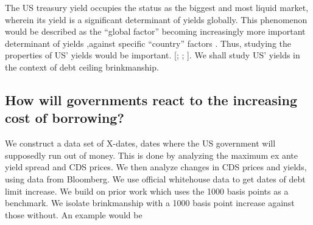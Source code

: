 \documentclass[
  12pt]{article}
\begin{document}
The US treasury yield occupies the status as the biggest and most liquid
market, wherein its yield is a significant determinant of yields
globally. This phenomenon would be described as the ``global factor''
becoming increasingly more important determinant of yields ,against
specific ``country'' factors \citet{mauro2002}. Thus, studying the
properties of US' yields would be important. {[}\citet{rozada2006};
\citet{gonzález-rozada2008}; \citet{longstaff2011}{]}. We shall study
US' yields in the context of debt ceiling brinkmanship.

\hypertarget{how-will-governments-react-to-the-increasing-cost-of-borrowing}{%
\subsection{How will governments react to the increasing cost of
borrowing?}\label{how-will-governments-react-to-the-increasing-cost-of-borrowing}}

We construct a data set of X-dates, dates where the US government will
supposedly run out of money. This is done by analyzing the maximum ex
ante yield spread and CDS prices. We then analyze changes in CDS prices
and yields, using data from Bloomberg. We use official whitehouse data
to get dates of debt limit increase. We build on prior work which uses
the 1000 basis points as a benchmark. We isolate brinkmanship with a
1000 basis point increase against those without. An example would be
\end{document}
